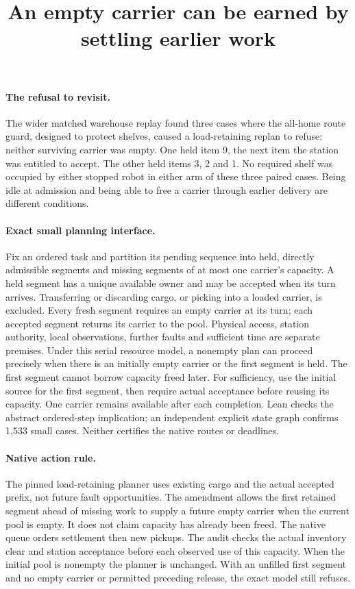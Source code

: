\documentclass{article}
\title{An empty carrier can be earned by settling earlier work}
\begin{document}
\maketitle
\paragraph{The refusal to revisit.}
The wider matched warehouse replay found three cases where the all-home route guard, designed to protect shelves, caused a load-retaining replan to refuse: neither surviving carrier was empty. One held item 9, the next item the station was entitled to accept. The other held items 3, 2 and 1. No required shelf was occupied by either stopped robot in either arm of these three paired cases. Being idle at admission and being able to free a carrier through earlier delivery are different conditions.

\paragraph{Exact small planning interface.}
Fix an ordered task and partition its pending sequence into held, directly admissible segments and missing segments of at most one carrier's capacity. A held segment has a unique available owner and may be accepted when its turn arrives. Transferring or discarding cargo, or picking into a loaded carrier, is excluded. Every fresh segment requires an empty carrier at its turn; each accepted segment returns its carrier to the pool. Physical access, station authority, local observations, further faults and sufficient time are separate premises. Under this serial resource model, a nonempty plan can proceed precisely when there is an initially empty carrier or the first segment is held. The first segment cannot borrow capacity freed later. For sufficiency, use the initial source for the first segment, then require actual acceptance before reusing its capacity. One carrier remains available after each completion. Lean checks the abstract ordered-step implication; an independent explicit state graph confirms 1,533 small cases. Neither certifies the native routes or deadlines.

\paragraph{Native action rule.}
The pinned load-retaining planner uses existing cargo and the actual accepted prefix, not future fault opportunities. The amendment allows the first retained segment ahead of missing work to supply a future empty carrier when the current pool is empty. It does not claim capacity has already been freed. The native queue orders settlement then new pickups. The audit checks the actual inventory clear and station acceptance before each observed use of this capacity. When the initial pool is nonempty the planner is unchanged. With an unfilled first segment and no empty carrier or permitted preceding release, the exact model still refuses.
\end{document}

